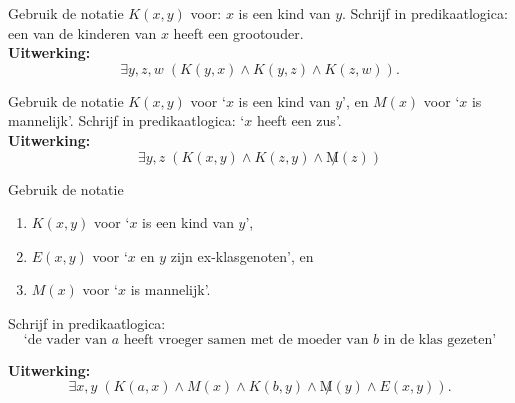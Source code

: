 \begin{answer}
Gebruik de notatie $K(x,y)$ voor: $x$ is een kind van $y$. Schrijf in predikaatlogica: een van de kinderen van $x$ heeft een grootouder.\\[2.5pt]

\noindent\textbf{Uitwerking:}
$$\exists y, z, w\;(K(y,x)\land K(y,z)\land K(z,w)).$$
\end{answer}

\begin{answer}
Gebruik de notatie $K(x,y)$ voor `$x$ is een kind van $y$', en $M(x)$ voor `$x$ is mannelijk'. Schrijf in predikaatlogica: `$x$ heeft een zus'.\\[2.5pt]

\noindent\textbf{Uitwerking:}
$$\exists y,z\;(K(x,y)\wedge K(z,y)\wedge\not M(z))$$
\end{answer}

\begin{answer}
Gebruik de notatie
\begin{enumerate}
    \item $K(x,y)$ voor `$x$ is een kind van $y$',
    \item $E(x,y)$ voor `$x$ en $y$ zijn ex-klasgenoten', en
    \item $M(x)$ voor `$x$ is mannelijk'.
\end{enumerate}
Schrijf in predikaatlogica:
$$\text{`de vader van $a$ heeft vroeger samen met de moeder van $b$ in de klas gezeten'}$$

\noindent\textbf{Uitwerking:}
$$\exists x, y\;(K(a,x)\wedge M(x)\wedge K(b,y)\wedge\not M(y)\wedge E(x,y)).$$
\end{answer}


